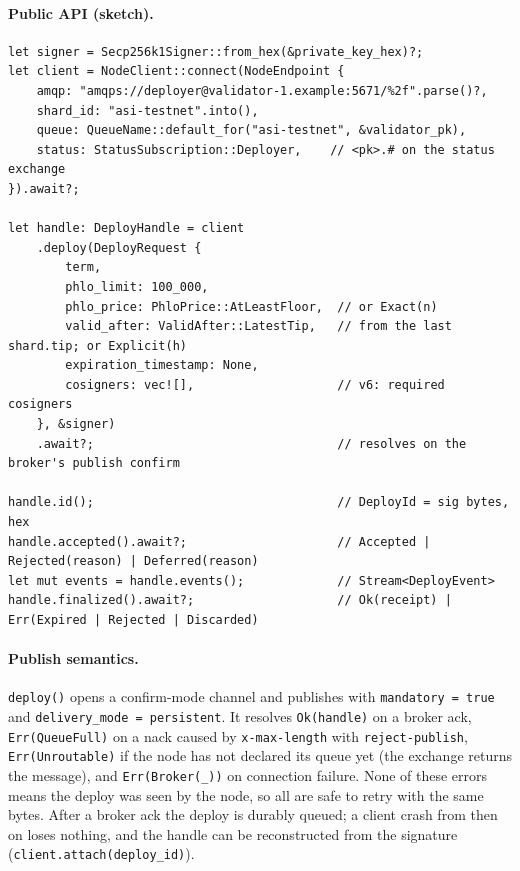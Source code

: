 \documentclass[11pt]{article}
\newcommand{\code}[1]{\texttt{#1}}
\begin{document}
\paragraph{Public API (sketch).}
\begin{lstlisting}
let signer = Secp256k1Signer::from_hex(&private_key_hex)?;
let client = NodeClient::connect(NodeEndpoint {
    amqp: "amqps://deployer@validator-1.example:5671/%2f".parse()?,
    shard_id: "asi-testnet".into(),
    queue: QueueName::default_for("asi-testnet", &validator_pk),
    status: StatusSubscription::Deployer,    // <pk>.# on the status exchange
}).await?;

let handle: DeployHandle = client
    .deploy(DeployRequest {
        term,
        phlo_limit: 100_000,
        phlo_price: PhloPrice::AtLeastFloor,  // or Exact(n)
        valid_after: ValidAfter::LatestTip,   // from the last shard.tip; or Explicit(h)
        expiration_timestamp: None,
        cosigners: vec![],                    // v6: required cosigners
    }, &signer)
    .await?;                                  // resolves on the broker's publish confirm

handle.id();                                  // DeployId = sig bytes, hex
handle.accepted().await?;                     // Accepted | Rejected(reason) | Deferred(reason)
let mut events = handle.events();             // Stream<DeployEvent>
handle.finalized().await?;                    // Ok(receipt) | Err(Expired | Rejected | Discarded)
\end{lstlisting}

\paragraph{Publish semantics.} \code{deploy()} opens a confirm-mode channel and
publishes with \code{mandatory = true} and \code{delivery\_mode = persistent}. It
resolves \code{Ok(handle)} on a broker ack, \code{Err(QueueFull)} on a nack caused
by \code{x-max-length} with \code{reject-publish}, \code{Err(Unroutable)} if the
node has not declared its queue yet (the exchange returns the message), and
\code{Err(Broker(\_))} on connection failure. None of these errors means the deploy
was seen by the node, so all are safe to retry with the same bytes. After a broker
ack the deploy is durably queued; a client crash from then on loses nothing, and the
handle can be reconstructed from the signature (\code{client.attach(deploy\_id)}).
\end{document}
